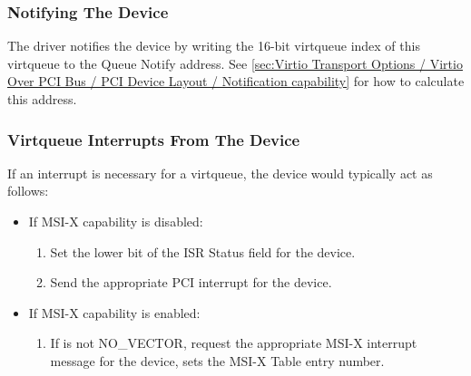 \subsubsection{Notifying The Device}\label{sec:Virtio Transport Options / Virtio Over PCI Bus / PCI-specific Initialization And Device Operation / Notifying The Device}

The driver notifies the device by writing the 16-bit virtqueue index
of this virtqueue to the Queue Notify address.  See \ref{sec:Virtio Transport Options / Virtio Over PCI Bus / PCI Device Layout / Notification capability} for how to calculate this address.

\subsubsection{Virtqueue Interrupts From The Device}\label{sec:Virtio Transport Options / Virtio Over PCI Bus / PCI-specific Initialization And Device Operation / Virtqueue Interrupts From The Device}

If an interrupt is necessary for a virtqueue, the device would typically act as follows:

\begin{itemize}
  \item If MSI-X capability is disabled:
    \begin{enumerate}
    \item Set the lower bit of the ISR Status field for the device.

    \item Send the appropriate PCI interrupt for the device.
    \end{enumerate}

  \item If MSI-X capability is enabled:
    \begin{enumerate}
    \item If  is not NO_VECTOR,
      request the appropriate MSI-X interrupt message for the
      device,  sets the MSI-X Table entry
      number.
    \end{enumerate}
\end{itemize}



